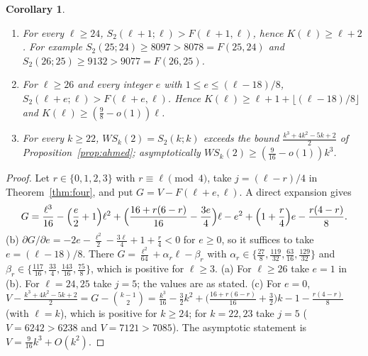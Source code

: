 \documentclass[11pt]{amsart}
\newtheorem{corollary}[theorem]{Corollary}
\theoremstyle{definition}
\newcommand{\F}{F}
\newcommand{\Stwo}{S_2}
\begin{document}
\begin{corollary}\label{cor:four}
\begin{enumerate}[label=(\alph*)]
\item For every $\ell\ge24$, $\Stwo(\ell+1;\ell)>\F(\ell+1,\ell)$, hence $K(\ell)\ge\ell+2$. For example $\Stwo(25;24)\ge8097>8078=\F(25,24)$ and $\Stwo(26;25)\ge9132>9077=\F(26,25)$.
\item For $\ell\ge26$ and every integer $e$ with $1\le e\le(\ell-18)/8$, $\Stwo(\ell+e;\ell)>\F(\ell+e,\ell)$. Hence $K(\ell)\ge\ell+1+\lfloor(\ell-18)/8\rfloor$ and $K(\ell)\ge(\tfrac98-o(1))\ell$.
\item For every $k\ge22$, $WS_k(2)=\Stwo(k;k)$ exceeds the bound $\frac{k^3+4k^2-5k+2}{2}$ of Proposition~\ref{prop:ahmed}; asymptotically $WS_k(2)\ge(\tfrac9{16}-o(1))k^3$.
\end{enumerate}
\end{corollary}

\begin{proof}
Let $r\in\{0,1,2,3\}$ with $r\equiv\ell\pmod4$, take $j=(\ell-r)/4$ in Theorem~\ref{thm:four}, and put $G=V-\F(\ell+e,\ell)$. A direct expansion gives
\[
G=\frac{\ell^3}{16}-\Bigl(\frac e2+1\Bigr)\ell^2+\Bigl(\frac{16+r(6-r)}{16}-\frac{3e}{4}\Bigr)\ell-e^2+\Bigl(1+\frac r4\Bigr)e-\frac{r(4-r)}{8}.
\]
(b) $\partial G/\partial e=-2e-\frac{\ell^2}{2}-\frac{3\ell}{4}+1+\frac r4<0$ for $e\ge0$, so it suffices to take $e=(\ell-18)/8$. There $G=\frac{\ell^2}{64}+\alpha_r\ell-\beta_r$ with $\alpha_r\in\{\frac{27}{8},\frac{119}{32},\frac{63}{16},\frac{129}{32}\}$ and $\beta_r\in\{\frac{117}{16},\frac{33}{4},\frac{143}{16},\frac{75}{8}\}$, which is positive for $\ell\ge3$.
(a) For $\ell\ge26$ take $e=1$ in (b). For $\ell=24,25$ take $j=5$; the values are as stated.
(c) For $e=0$, $V-\frac{k^3+4k^2-5k+2}{2}=G-\binom{k-1}{2}=\frac{k^3}{16}-\frac32k^2+\bigl(\frac{16+r(6-r)}{16}+\frac32\bigr)k-1-\frac{r(4-r)}{8}$ (with $\ell=k$), which is positive for $k\ge24$; for $k=22,23$ take $j=5$ ($V=6242>6238$ and $V=7121>7085$). The asymptotic statement is $V=\frac{9}{16}k^3+O(k^2)$.
\end{proof}
\end{document}
